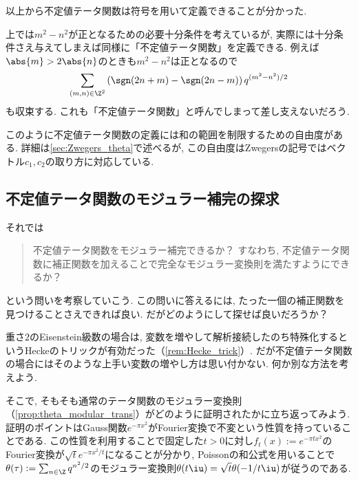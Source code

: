 \documentclass[11pt,b5paper,oneside,lualatex]{ltjsarticle} %
\numberwithin{equation}{section} %
\begin{document}
以上から不定値テータ関数は符号を用いて定義できることが分かった. 

\begin{rem} \label{rem:indef_ambiguity}
	上では$ m^2 - n^2 $が正となるための必要十分条件を考えているが, 実際には十分条件さえ与えてしまえば同様に「不定値テータ関数」を定義できる. 
	例えば$ \abs{m} > 2\abs{n} $のときも$ m^2 - n^2 $は正となるので
	\[
	\sum_{(m, n) \in \Z^2} \left( \sgn(2n+m) - \sgn(2n-m) \right) q^{(m^2 - n^2)/2}
	\]
	も収束する. 
	これも「不定値テータ関数」と呼んでしまって差し支えないだろう. 
	
	このように不定値テータ関数の定義には和の範囲を制限するための自由度がある. 
	詳細は\cref{sec:Zwegers_theta}で述べるが, この自由度はZwegersの記号ではベクトル$ c_1, c_2 $の取り方に対応している. 
\end{rem}



\subsection{不定値テータ関数のモジュラー補完の探求} \label{subsec:modular_completion}


それでは
\begin{quote}
	\centering
	不定値テータ関数をモジュラー補完できるか？
	すなわち, 不定値テータ関数に補正関数を加えることで完全なモジュラー変換則を満たすようにできるか？
\end{quote}
という問いを考察していこう. 
この問いに答えるには, たった一個の補正関数を見つけることさえできれば良い. 
だがどのようにして探せば良いだろうか？

重さ$ 2 $のEisenstein級数の場合は, 変数を増やして解析接続したのち特殊化するというHeckeのトリックが有効だった（\cref{rem:Hecke_trick}）. 
だが不定値テータ関数の場合にはそのような上手い変数の増やし方は思い付かない. 
何か別な方法を考えよう. 

そこで, そもそも通常のテータ関数のモジュラー変換則（\cref{prop:theta_modular_trans}）がどのように証明されたかに立ち返ってみよう. 
証明のポイントはGauss関数$ e^{-\pi x^2} $がFourier変換で不変という性質を持っていることである. 
この性質を利用することで固定した$ t > 0 $に対し$ f_t (x) := e^{-\pi t x^2} $のFourier変換が$ \sqrt{t} e^{-\pi  x^2/t} $になることが分かり, Poissonの和公式を用いることで$ \theta (\tau) := \sum_{n \in \Z} q^{n^2/2} $のモジュラー変換則$ \theta (t\iu) = \sqrt{t} \theta (-1/t\iu) $が従うのである. 
\end{document}
